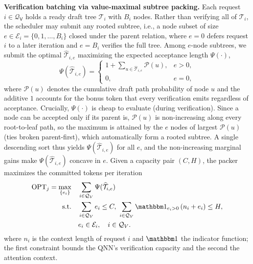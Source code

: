 \documentclass[sigconf,nonacm,10pt]{acmart}
\begin{document}
\noindent\textbf{Verification batching via value-maximal subtree packing.} \label{sec:batching_verify}
Each request $i\in\mathcal Q_{\mathsf V}$ holds a ready draft tree $\mathcal T_i$ with $B_i$ nodes. Rather than verifying all of $\mathcal T_i$, the scheduler may submit any rooted subtree, i.e., a node subset of size $e\in\mathcal E_i=\{0,1,\ldots,B_i\}$ closed under the parent relation, where $e=0$ defers request $i$ to a later iteration and $e=B_i$ verifies the full tree.
Among $e$-node subtrees, we submit the optimal $\widehat {\mathcal T}_{i,e}$ maximizing the expected acceptance length $\Psi(\cdot)$,
\begin{equation}
\Psi (\widehat {\mathcal T}_{i,e})=
\begin{cases}
1+\sum_{u\in \widehat {\mathcal T}_{i,e}}\mathcal P(u), & e>0,\\[2pt]
0, & e=0,
\end{cases}
\label{equ:verify_value}
\end{equation}
where $\mathcal P(u)$ denotes the cumulative draft path probability of node $u$ and the additive $1$ accounts for the bonus token that every verification emits regardless of acceptance. Crucially, $\Psi(\cdot)$ is cheap to evaluate {\color{red}(during verification)}. Since a node can be accepted only if its parent is, $\mathcal P(u)$ is non-increasing along every root-to-leaf path, so the maximum is attained by the $e$ nodes of largest $\mathcal P(u)$ (ties broken parent-first), which automatically form a rooted subtree.
A single descending sort thus yields $\Psi (\widehat {\mathcal T}_{i,e})$ for all $e$, and the non-increasing marginal gains make $\Psi (\widehat {\mathcal T}_{i,e})$ concave in $e$. Given a capacity pair $(C,H)$, the packer maximizes the committed tokens  per iteration
\begin{equation}
\begin{aligned}
\operatorname{OPT}_j=\max_{\{e_i\}}\quad
&\sum_{i\in\mathcal Q_V} \Psi (\widehat {\mathcal T}_{i,e}) \\
\mathrm{s.t.}\quad
&\sum_{i\in \mathcal Q_V} e_i\leq C,
\ 
\sum_{i\in\mathcal Q_V} \mathbbm 1_{e_i>0}\,(n_i+e_i)\leq H,\\
&e_i\in\mathcal E_i,\quad i\in\mathcal Q_V.
\end{aligned}
\label{equ:verify_opt}
\end{equation}
where $n_i$ is the context length of request $i$ and $\mathbbm 1$ the indicator function; the first constraint bounds the QNN's verification capacity and the second the attention context.
\end{document}
